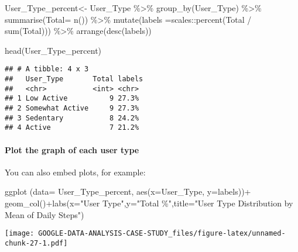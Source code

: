 \documentclass[
]{article}
\newenvironment{Shaded}{\begin{snugshade}}{\end{snugshade}}
\newcommand{\AttributeTok}[1]{\textcolor[rgb]{0.77,0.63,0.00}{#1}}
\newcommand{\FunctionTok}[1]{\textcolor[rgb]{0.00,0.00,0.00}{#1}}
\newcommand{\NormalTok}[1]{#1}
\newcommand{\OtherTok}[1]{\textcolor[rgb]{0.56,0.35,0.01}{#1}}
\newcommand{\SpecialCharTok}[1]{\textcolor[rgb]{0.00,0.00,0.00}{#1}}
\newcommand{\StringTok}[1]{\textcolor[rgb]{0.31,0.60,0.02}{#1}}
\begin{document}
\begin{Shaded}
\begin{Highlighting}[]
\NormalTok{User\_Type\_percent}\OtherTok{\textless{}{-}}\NormalTok{ User\_Type }\SpecialCharTok{\%\textgreater{}\%}
  \FunctionTok{group\_by}\NormalTok{(User\_Type) }\SpecialCharTok{\%\textgreater{}\%}
  \FunctionTok{summarise}\NormalTok{(}\AttributeTok{Total=} \FunctionTok{n}\NormalTok{()) }\SpecialCharTok{\%\textgreater{}\%}
  \FunctionTok{mutate}\NormalTok{(}\AttributeTok{labels =}\NormalTok{scales}\SpecialCharTok{::}\FunctionTok{percent}\NormalTok{(Total }\SpecialCharTok{/} \FunctionTok{sum}\NormalTok{(Total))) }\SpecialCharTok{\%\textgreater{}\%} 
  \FunctionTok{arrange}\NormalTok{(}\FunctionTok{desc}\NormalTok{(labels))}

\FunctionTok{head}\NormalTok{(User\_Type\_percent)}
\end{Highlighting}
\end{Shaded}

\begin{verbatim}
## # A tibble: 4 x 3
##   User_Type       Total labels
##   <chr>           <int> <chr> 
## 1 Low Active          9 27.3% 
## 2 Somewhat Active     9 27.3% 
## 3 Sedentary           8 24.2% 
## 4 Active              7 21.2%
\end{verbatim}

\hypertarget{plot-the-graph-of-each-user-type}{%
\paragraph{Plot the graph of each user
type}\label{plot-the-graph-of-each-user-type}}

You can also embed plots, for example:

\begin{Shaded}
\begin{Highlighting}[]
\FunctionTok{ggplot}\NormalTok{ (}\AttributeTok{data=}\NormalTok{ User\_Type\_percent, }\FunctionTok{aes}\NormalTok{(}\AttributeTok{x=}\NormalTok{User\_Type, }\AttributeTok{y=}\NormalTok{labels))}\SpecialCharTok{+}
  \FunctionTok{geom\_col}\NormalTok{()}\SpecialCharTok{+}\FunctionTok{labs}\NormalTok{(}\AttributeTok{x=}\StringTok{"User Type"}\NormalTok{,}\AttributeTok{y=}\StringTok{"Total \%"}\NormalTok{,}\AttributeTok{title=}\StringTok{"User Type Distribution by Mean of Daily Steps"}\NormalTok{)}
\end{Highlighting}
\end{Shaded}

\texttt{[image: GOOGLE-DATA-ANALYSIS-CASE-STUDY\_files/figure-latex/unnamed-chunk-27-1.pdf]}
\end{document}
